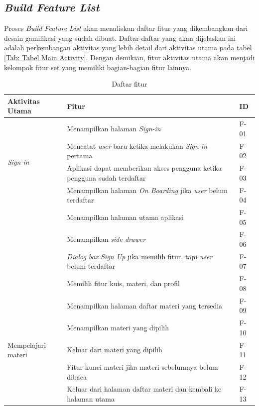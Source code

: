 \subsection{\textit{Build Feature List}}
Proses \textit{Build Feature List} akan menuliskan daftar fitur yang dikembangkan dari desain gamifikasi yang sudah dibuat.
Daftar-daftar yang akan dijelaskan ini adalah perkembangan aktivitas yang lebih detail dari aktivitas utama pada tabel \ref*{Tab: Tabel Main Activity}.
Dengan demikian, fitur aktivitas utama akan menjadi kelompok fitur set yang memiliki bagian-bagian fitur lainnya.
\begin{table}[H]
	\centering
	\caption{Daftar fitur}
	\begin{tabular}{|m{3cm}|p{}|m{1cm}|}
		\hline
		\centering\textbf{Aktivitas Utama} & \centering\textbf{Fitur} & \multicolumn{1}{m{1cm}|}{\centering \textbf{ID}} \\
		\hline
		\multirow{4}{2.5cm}{\textit{Sign-in}} &Menampilkan halaman \textit{Sign-in} & F-01 \\
		\cline{2-3}
		 &Mencatat \textit{user} baru ketika melakukan \textit{Sign-in} pertama & F-02 \\
		\cline{2-3}
		 &Aplikasi dapat memberikan akses pengguna ketika pengguna sudah terdaftar& F-03 \\
		\hline
		\multirow{5}{2.5cm}{Melihat \textit{dashboard} halaman utama} &Menampilkan halaman \textit{On Boarding} jika \textit{user} belum terdaftar & F-04 \\
		\cline{2-3}
		&Menampilkan halaman utama aplikasi& F-05 \\
		\cline{2-3}
		&Menampilkan \textit{side drawer}& F-06 \\
		\cline{2-3}
		&\textit{Dialog box Sign Up} jika memilih fitur, tapi \textit{user} belum terdaftar& F-07 \\
		\cline{2-3}
		&Memilih fitur kuis, materi, dan profil& F-08 \\
		\hline
		\multirow{6}{2.5cm}{Mempelajari materi} &Menampilkan halaman daftar materi yang tersedia& F-09 \\
		\cline{2-3}
		&Menampilkan materi yang dipilih & F-10 \\
		\cline{2-3}
		&Keluar dari materi yang dipilih& F-11 \\
		\cline{2-3}
		&Fitur kunci materi jika materi sebelumnya belum dibaca& F-12 \\
		\cline{2-3}
		&Keluar dari halaman daftar materi dan kembali ke halaman utama& F-13 \\
		\hline

	\end{tabular}
\end{table}

